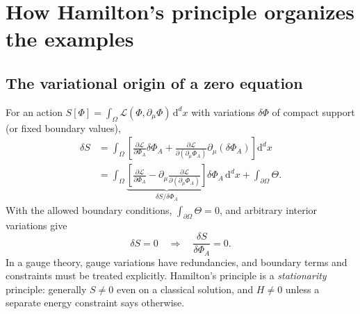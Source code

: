 \documentclass[11pt,a4paper]{article}
\newcommand{\dd}{\mathrm{d}}
\theoremstyle{tmon}
\theoremstyle{definition}
\begin{document}
\section{How Hamilton's principle organizes the examples}
\subsection{The variational origin of a zero equation}
For an action $S[\Phi]=\int_\Omega \mathscr L(\Phi,\partial_\mu\Phi)\,\dd^dx$ with variations $\delta\Phi$ of compact support (or fixed boundary values),
\begin{align}
\delta S
&=\int_\Omega\left[
\frac{\partial\mathscr L}{\partial\Phi_A}\delta\Phi_A
+\frac{\partial\mathscr L}{\partial(\partial_\mu\Phi_A)}
\partial_\mu(\delta\Phi_A)\right]\dd^dx\\
&=\int_\Omega
\underbrace{\left[
\frac{\partial\mathscr L}{\partial\Phi_A}
-\partial_\mu\frac{\partial\mathscr L}{\partial(\partial_\mu\Phi_A)}
\right]}_{\displaystyle \delta S/\delta\Phi_A}
\delta\Phi_A\,\dd^dx
+\int_{\partial\Omega}\Theta.
\end{align}
With the allowed boundary conditions, $\int_{\partial\Omega}\Theta=0$, and arbitrary interior variations give
\begin{equation}\label{eq:EL}
\boxed{\delta S=0\quad\Longrightarrow\quad
\frac{\delta S}{\delta\Phi_A}=0.}
\end{equation}
In a gauge theory, gauge variations have redundancies, and boundary terms and constraints must be treated explicitly. Hamilton's principle is a \emph{stationarity} principle: generally $S\neq0$ even on a classical solution, and $H\neq0$ unless a separate energy constraint says otherwise.
\end{document}

